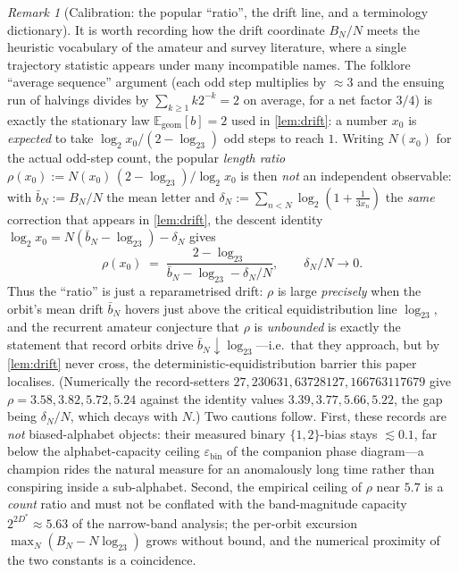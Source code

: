 \documentclass[11pt]{article}
\newcommand{\E}{\mathbb{E}}
\theoremstyle{plain}
\theoremstyle{definition}
\theoremstyle{remark}
\newtheorem*{remark}{Remark}
\begin{document}
\begin{remark}[Calibration: the popular ``ratio'', the drift line, and a
terminology dictionary]\label{rem:calibration}
It is worth recording how the drift coordinate $B_N/N$ meets the
heuristic vocabulary of the amateur and survey literature, where a
single trajectory statistic appears under many incompatible names. The
folklore ``average sequence'' argument (each odd step multiplies by
$\approx3$ and the ensuing run of halvings divides by
$\sum_{k\ge1}k2^{-k}=2$ on average, for a net factor $3/4$) is exactly
the stationary law $\E_{\mathrm{geom}}[b]=2$ used in
\cref{lem:drift}: a number $x_0$ is \emph{expected} to take
$\log_2x_0/(2-\log_23)$ odd steps to reach $1$. Writing $N(x_0)$ for the
actual odd-step count, the popular \emph{length ratio}
$\rho(x_0):=N(x_0)\,(2-\log_23)/\log_2x_0$ is then \emph{not} an
independent observable: with $\bar b_N:=B_N/N$ the mean letter and
$\delta_N:=\sum_{n<N}\log_2(1+\tfrac1{3x_n})$ the \emph{same} correction
that appears in \cref{lem:drift}, the descent identity
$\log_2x_0=N(\bar b_N-\log_23)-\delta_N$ gives
\[
\rho(x_0)\;=\;\frac{2-\log_23}{\bar b_N-\log_23-\delta_N/N},
\qquad \delta_N/N\to0 .
\]
Thus the ``ratio'' is just a reparametrised drift: $\rho$ is large
\emph{precisely} when the orbit's mean drift $\bar b_N$ hovers just above
the critical equidistribution line $\log_23$, and the recurrent amateur
conjecture that $\rho$ is \emph{unbounded} is exactly the statement that
record orbits drive $\bar b_N\downarrow\log_23$---i.e.\ that they
approach, but by \cref{lem:drift} never cross, the
deterministic-equidistribution barrier this paper localises. (Numerically
the record-setters $27,230631,63728127,166763117679$ give
$\rho=3.58,3.82,5.72,5.24$ against the identity values
$3.39,3.77,5.66,5.22$, the gap being $\delta_N/N$, which decays with
$N$.) Two cautions follow. First, these records are \emph{not}
biased-alphabet objects: their measured binary $\{1,2\}$-bias stays
$\lesssim0.1$, far below the alphabet-capacity ceiling
$\varepsilon_{\mathrm{bin}}$ of the companion phase diagram---a champion
rides the natural measure for an anomalously long time rather than
conspiring inside a sub-alphabet. Second, the empirical ceiling of
$\rho$ near $5.7$ is a \emph{count} ratio and must not be conflated with
the band-magnitude capacity $2^{2D^\ast}\approx5.63$ of the narrow-band
analysis; the per-orbit excursion $\max_N(B_N-N\log_23)$ grows without
bound, and the numerical proximity of the two constants is a
coincidence.


\end{remark}
\end{document}

